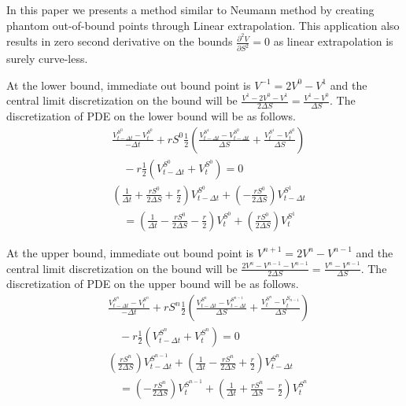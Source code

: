 \documentclass{article}
\begin{document}
In this paper we presents a method similar to Neumann method by creating phantom out-of-bound points through Linear extrapolation.
This application also results in zero second derivative on the bounds $ \frac{\partial^2 V}{\partial S^2} = 0 $ as linear extrapolation is surely curve-less.

At the lower bound, immediate out bound point is $ V^{-1} = 2 V^{0} - V^{1} $ and the central limit discretization on the bound will be $ \frac{V^{1} - 2 V^{0} - V^{1}}{2 \Delta S} = \frac{V^{1} - V^{0}}{\Delta S}$. The discretization of PDE on the lower bound will be as follows.
\begin{align}
    & \frac{V_{t - \Delta t}^{S^{0}} - V_{t}^{S^{0}}}{-\Delta t} + r S^{0} \frac{1}{2} \left(\frac{V_{t - \Delta t}^{S^{1}} - V_{t - \Delta t}^{S^{0}}}{\Delta S} + \frac{V_{t}^{S^{1}} - V_{t}^{S^{0}}}{\Delta S}\right) \nonumber \\
    & \quad - r \frac{1}{2} \left(V_{t - \Delta t}^{S^{0}} + V_{t}^{S^{0}}\right) = 0 \nonumber \\
    & \left(\frac{1}{\Delta t} + \frac{r S^{0}}{2 \Delta S} + \frac{r}{2}\right) V_{t - \Delta t}^{S^{0}} + \left(-\frac{r S^{0}}{2 \Delta S}\right) V_{t - \Delta t}^{S^{1}} \nonumber \\
    & \quad = \left(\frac{1}{\Delta t} - \frac{r S^{0}}{2 \Delta S} - \frac{r}{2}\right) V_{t}^{S^{0}} + \left(\frac{r S^{0}}{2 \Delta S}\right) V_{t}^{S^{1}}
\end{align}

At the upper bound, immediate out bound point is $ V^{n + 1} = 2 V^{n} - V^{n - 1} $ and the central limit discretization on the bound will be $ \frac{2 V^{n} - V^{n - 1} - V^{n - 1}}{2 \Delta S} = \frac{V^{n} - V^{n - 1}}{\Delta S}$.
The discretization of PDE on the upper bound will be as follows.
\begin{align}
    & \frac{V_{t - \Delta t}^{S^{n}} - V_{t}^{S^{n}}}{-\Delta t} + r S^{n} \frac{1}{2} \left(\frac{V_{t - \Delta t}^{S^{n}} - V_{t - \Delta t}^{S^{n - 1}}}{\Delta S} + \frac{V_{t}^{S^{n}} - V_{t}^{S_{n-1}}}{\Delta S}\right) \nonumber \\
    & \quad -r \frac{1}{2} \left(V_{t - \Delta t}^{S^{n}} + V_{t}^{S^{n}}\right) = 0 \nonumber \\
    & \left(\frac{r S^{n}}{2 \Delta S}\right) V_{t - \Delta t}^{S^{n - 1}} + \left(\frac{1}{\Delta t} - \frac{r S^{n}}{2 \Delta S} + \frac{r}{2}\right) V_{t - \Delta t}^{S^{n}} \nonumber \\
    & \quad = \left(-\frac{r S^{n}}{2 \Delta S}\right) V_{t}^{S^{n - 1}} + \left(\frac{1}{\Delta t} + \frac{r S^{n}}{\Delta S} - \frac{r}{2}\right) V_{t}^{S^{n}}
\end{align}
\end{document}
